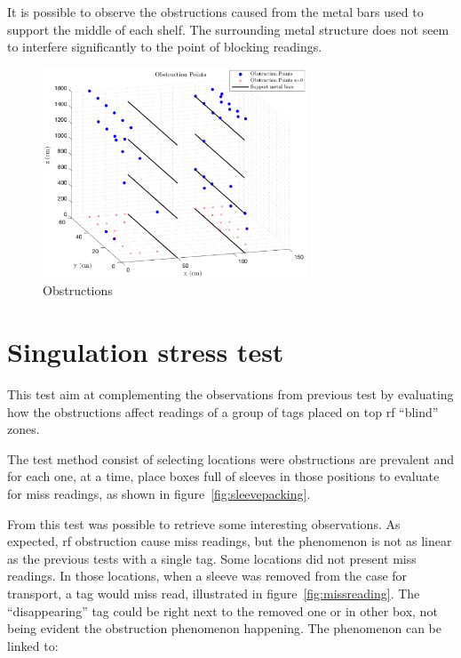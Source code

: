 
It is possible to observe the obstructions caused from the metal bars used to support the middle of each shelf. The surrounding metal structure does not seem to interfere significantly to the point of blocking readings.

\begin{figure}
    \centering
    \includegraphics[width=0.7\textwidth]{figs/tests/obstructions.eps}
    \caption{Obstructions}
    \label{fig:shelveobstructions}
\end{figure}

\section{Singulation stress test}

This test aim at complementing the observations from previous test by evaluating how the obstructions affect readings of a group of tags placed on top \ac{rf} ``blind'' zones.

The test method consist of selecting locations were obstructions are prevalent and for each one, at a time, place boxes full of sleeves in those positions to evaluate for miss readings, as shown in figure~\ref{fig:sleevepacking}.

From this test was possible to retrieve some interesting observations. 
As expected, \ac{rf} obstruction cause miss readings, but the phenomenon is not as linear as the previous tests with a single tag. 
Some locations did not present miss readings. In those locations, when a sleeve was removed from the case for transport, a tag would miss read, illustrated in figure~\ref{fig:missreading}. The ``disappearing'' tag could be right next to the removed one or in other box, not being evident the obstruction phenomenon happening.
The phenomenon can be linked to:

